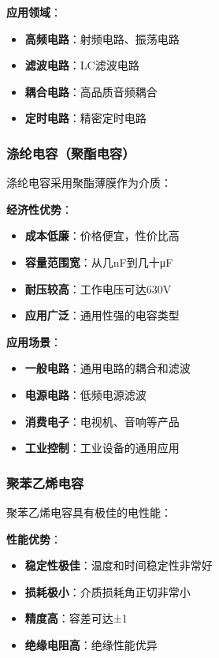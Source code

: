 \documentclass[12pt,UTF8]{ctexbook}
\begin{document}
\textbf{应用领域}：
\begin{itemize}[leftmargin=3.5em]
    \item \textbf{高频电路}：射频电路、振荡电路
    \item \textbf{滤波电路}：LC滤波电路
    \item \textbf{耦合电路}：高品质音频耦合
    \item \textbf{定时电路}：精密定时电路
\end{itemize}

\subsubsection{涤纶电容（聚酯电容）}

涤纶电容采用聚酯薄膜作为介质：

\textbf{经济性优势}：
\begin{itemize}[leftmargin=3.5em]
    \item \textbf{成本低廉}：价格便宜，性价比高
    \item \textbf{容量范围宽}：从几nF到几十μF
    \item \textbf{耐压较高}：工作电压可达630V
    \item \textbf{应用广泛}：通用性强的电容类型
\end{itemize}

\textbf{应用场景}：
\begin{itemize}[leftmargin=3.5em]
    \item \textbf{一般电路}：通用电路的耦合和滤波
    \item \textbf{电源电路}：低频电源滤波
    \item \textbf{消费电子}：电视机、音响等产品
    \item \textbf{工业控制}：工业设备的通用应用
\end{itemize}

\subsubsection{聚苯乙烯电容}

聚苯乙烯电容具有极佳的电性能：

\textbf{性能优势}：
\begin{itemize}[leftmargin=3.5em]
    \item \textbf{稳定性极佳}：温度和时间稳定性非常好
    \item \textbf{损耗极小}：介质损耗角正切非常小
    \item \textbf{精度高}：容差可达±1%
    \item \textbf{绝缘电阻高}：绝缘性能优异
\end{itemize}
\end{document}
